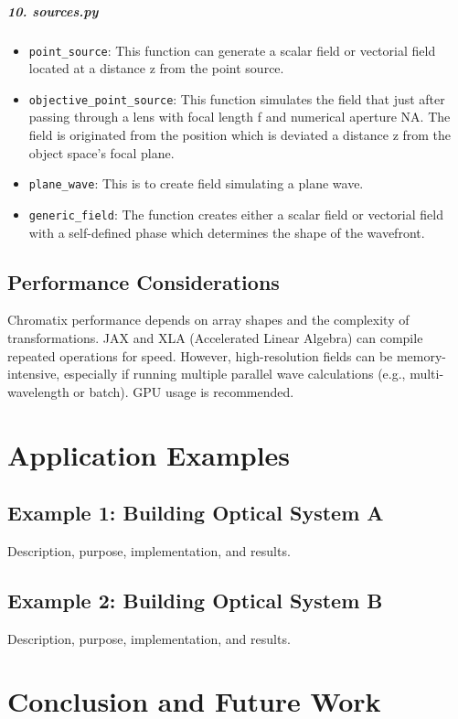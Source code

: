 \documentclass[a4paper,12pt]{report}
\begin{document}
\paragraph*{10. \textbf{sources.py}}
\begin{itemize}
  \item \texttt{point\_source}: This function can generate a scalar field or vectorial field located at a distance z from the point source.
  \item \texttt{objective\_point\_source}: This function simulates the field that just after passing through a lens with focal length f and numerical aperture NA. The field is originated from the position which is deviated a distance z from the object space's focal plane.
  \item \texttt{plane\_wave}: This is to create field simulating a plane wave.
  \item \texttt{generic\_field}: The function creates either a scalar field or vectorial field with a self-defined phase which determines the shape of the wavefront.
\end{itemize}

\section{Performance Considerations}
Chromatix performance depends on array shapes and the complexity of transformations. JAX and XLA (Accelerated Linear Algebra) can compile repeated operations for speed. However, high-resolution fields can be memory-intensive, especially if running multiple parallel wave calculations (e.g., multi-wavelength or batch). GPU usage is recommended.

\chapter{Application Examples}
\section{Example 1: Building Optical System A}
Description, purpose, implementation, and results.

\section{Example 2: Building Optical System B}
Description, purpose, implementation, and results.

\chapter{Conclusion and Future Work}
\end{document}
